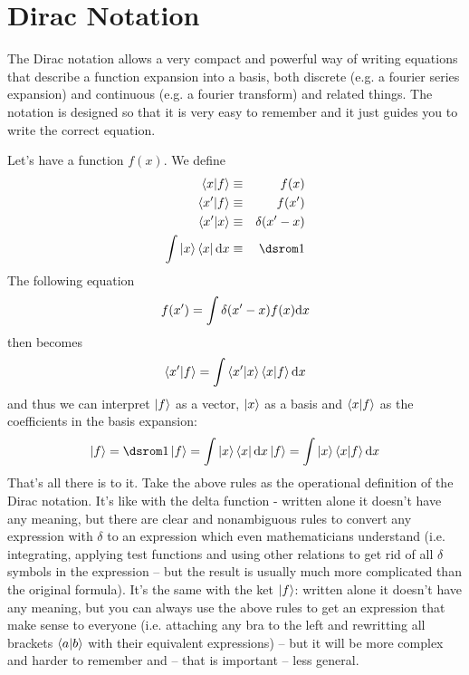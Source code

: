 \section{Dirac Notation}

The Dirac notation allows a very compact and powerful way of writing equations that describe a function expansion into a basis, both discrete (e.g. a fourier series expansion) and continuous (e.g. a fourier transform) and related things. The notation is designed so that it is very easy to remember and it just guides you to write the correct equation.

Let's have a function $f(x)$. We define 
\begin{eqnarray*}
\braket{x|f}&\equiv& f(x) \\
\braket{x'|f}&\equiv& f(x') \\
\braket{x'|x}&\equiv&\delta(x'-x) \\
\int\ket{x}\bra{x}\d x&\equiv&\one \\
\end{eqnarray*}
 The following equation 
\begin{equation*}
  f(x')=\int\delta(x'-x)f(x){\rm d} x
\end{equation*}
then becomes 
\begin{equation*}
  \mathinner{\langle{x'|f}\rangle}=\int\mathinner{\langle{x'|x}\rangle}\mathinner{\langle{x|f}\rangle}{\rm d} x
\end{equation*}
and thus we can interpret $\mathinner{|{f}\rangle}$ as a vector, $\mathinner{|{x}\rangle}$ as a basis and $\mathinner{\langle{x|f}\rangle}$ as the coefficients in the basis expansion: 
\begin{equation*}
  \ket{f}=\one\ket{f}=\int\ket{x}\bra{x}\d x\ket{f}= \int\ket{x}\braket{x|f}\d x
\end{equation*}
That's all there is to it. Take the above rules as the operational definition of the Dirac notation. It's like with the delta function - written alone it doesn't have any meaning, but there are clear and nonambiguous rules to convert any expression with $\delta$ to an expression which even mathematicians understand (i.e. integrating, applying test functions and using other relations to get rid of all $\delta$ symbols in the expression -- but the result is usually much more complicated than the original formula). It's the same with the ket $\mathinner{|{f}\rangle}$: written alone it doesn't have any meaning, but you can always use the above rules to get an expression that make sense to everyone (i.e. attaching any bra to the left and rewritting all brackets $\mathinner{\langle{a|b}\rangle}$ with their equivalent expressions) -- but it will be more complex and harder to remember and -- that is important -- less general.

